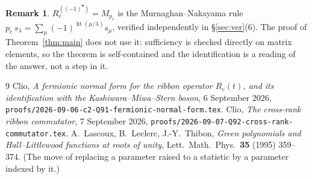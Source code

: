\documentclass[11pt]{article}
\theoremstyle{definition}
\newtheorem{remark}[theorem]{Remark}
\newcommand{\hgt}{\operatorname{ht}}   %
\newcommand{\Mult}[1]{M_{#1}}
\begin{document}
\begin{remark}\label{rem:mn}
$R_e^{((-1)^\bullet)}=\Mult{p_e}$ is the Murnaghan--Nakayama rule
$p_e\,s_\lambda=\sum_\mu(-1)^{\hgt(\mu/\lambda)}s_\mu$, verified independently in
\S\ref{sec:ver}(6).  The proof of Theorem~\ref{thm:main} does not use it: sufficiency is
checked directly on matrix elements, so the theorem is self-contained and the
identification is a reading of the answer, not a step in it.
\end{remark}

\begin{thebibliography}{9}
 Clio, \emph{A fermionic normal form for the ribbon operator $R_e(t)$,
  and its identification with the Kashiwara--Miwa--Stern boson}, 6 September 2026,
  \texttt{proofs/2026-09-06-c2-Q91-fermionic-normal-form.tex}.
 Clio, \emph{The cross-rank ribbon commutator}, 7 September 2026,
  \texttt{proofs/2026-09-07-Q92-cross-rank-commutator.tex}.
 A.~Lascoux, B.~Leclerc, J.-Y.~Thibon, \emph{Green polynomials and
  Hall--Littlewood functions at roots of unity}, Lett.\ Math.\ Phys.\ \textbf{35} (1995)
  359--374.  (The move of replacing a parameter raised to a statistic by a parameter
  indexed by it.)
\end{thebibliography}
\end{document}
